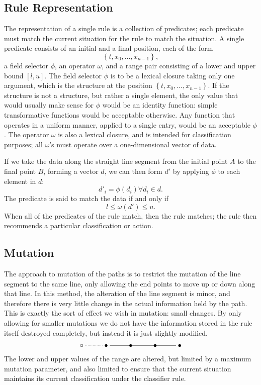 \subsection{Rule Representation}
The representation of a single rule is a collection of predicates;
each predicate must match the current situation for the rule to match the situation.
A single predicate consists of an initial and a final position,
each of the form
\begin{equation}
\left\{ t, x_0, \ldots, x_{n-1} \right\},
\end{equation}
a field selector $\phi$, an operator $\omega$, and a range pair consisting of a lower and upper bound $[l,u]$.
The field selector $\phi$ is to be a lexical closure taking only one argument, which is the structure at the position
$\left\{t,x_0,\ldots,x_{n-1}\right\}$.
If the structure is not a structure, but rather a single element, the only value that would usually make sense for $\phi$ would be an identity function:
simple transformative functions would be acceptable otherwise.
Any function that operates in a uniform manner, applied to a single entry, would be an acceptable $\phi$.
The operator $\omega$ is also a lexical closure, and is intended for classification purposes; all $\omega$'s must operate over a one-dimensional vector of data.

If we take the data along the straight line segment from the initial point $A$ to the final point $B$, forming a vector $d$, we can then form $d'$ by applying $\phi$ to each element in $d$:
\begin{equation}
d'_i = \phi \left(d_i\right) \forall d_i \in d.
\end{equation}
The predicate is said to match the data if and only if
\begin{equation}
l \le \omega \left( d' \right) \le u.
\end{equation}
When all of the predicates of the rule match, then the rule matches; the rule then recommends a particular classification or action.

\subsection{Mutation}
\label{sec:mutation}
The approach to mutation of the paths is to restrict the mutation of the line segment to the same line, only allowing the end points to move up or down along that line.
In this method, the alteration of the line segment is minor, and therefore there is very little change in the actual information held by the path.
This is exactly the sort of effect we wish in mutation: small changes.
By only allowing for smaller mutations we do not have the information stored in the rule itself destroyed completely, but instead it is just slightly modified.
\[\xymatrix{\circ \ar@{.}[r] & \bullet \ar@{-}[rrr] & \bullet & \bullet & \bullet }\]
The lower and upper values of the range are altered, but limited by a maximum mutation parameter, and also limited to ensure that the current situation maintains its current classification under the classifier rule.

